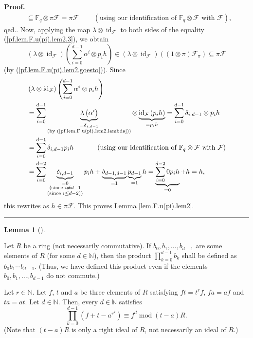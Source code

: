 \documentclass[numbers=enddot,12pt,final,onecolumn,notitlepage]{scrartcl}%
\theoremstyle{definition}
\newtheorem{lem}[theo]{Lemma}
\newenvironment{lemma}[1][]
{\begin{lem}[#1]\begin{leftbar}}
{\end{leftbar}\end{lem}}
\newenvironment{proof}[1][Proof]{\noindent\textbf{#1.} }{\ \rule{0.5em}{0.5em}}
\let\sumnonlimits\sum
\let\prodnonlimits\prod
\renewcommand{\sum}{\sumnonlimits\limits}
\renewcommand{\prod}{\prodnonlimits\limits}
\begin{document}
\begin{proof}
{\begin{align*}
&  \subseteq\mathbb{F}_{q}\otimes\pi\mathcal{F}=\pi\mathcal{F}%
\ \ \ \ \ \ \ \ \ \ \left(  \text{using our identification of }\mathbb{F}%
_{q}\otimes\mathcal{F}\text{ with }\mathcal{F}\right)  ,
\end{align*}
qed.}. Now, applying the map $\lambda\otimes\operatorname*{id}%
\nolimits_{\mathcal{F}}$ to both sides of the equality
(\ref{pf.lem.F.u(pi).lem2.3}), we obtain%
\[
\left(  \lambda\otimes\operatorname*{id}\nolimits_{\mathcal{F}}\right)
\left(  \sum_{i=0}^{d-1}\alpha^{i}\otimes p_{i}h\right)  \in\left(
\lambda\otimes\operatorname*{id}\nolimits_{\mathcal{F}}\right)  \left(
\left(  1\otimes\pi\right)  \mathcal{F}_{\pi}\right)  \subseteq\pi\mathcal{F}%
\]
(by (\ref{pf.lem.F.u(pi).lem2.goesto})). Since%
\begin{align*}
&  \left(  \lambda\otimes\operatorname*{id}\nolimits_{\mathcal{F}}\right)
\left(  \sum_{i=0}^{d-1}\alpha^{i}\otimes p_{i}h\right) \\
&  =\sum_{i=0}^{d-1}\underbrace{\lambda\left(  \alpha^{i}\right)
}_{\substack{=\delta_{i,d-1}\\\text{(by (\ref{pf.lem.F.u(pi).lem2.lambda}))}%
}}\otimes\underbrace{\operatorname*{id}\nolimits_{\mathcal{F}}\left(
p_{i}h\right)  }_{=p_{i}h}=\sum_{i=0}^{d-1}\delta_{i,d-1}\otimes p_{i}h\\
&  =\sum_{i=0}^{d-1}\delta_{i,d-1}p_{i}h\ \ \ \ \ \ \ \ \ \ \left(
\text{using our identification of }\mathbb{F}_{q}\otimes\mathcal{F}\text{ with
}\mathcal{F}\right) \\
&  =\sum_{i=0}^{d-2}\underbrace{\delta_{i,d-1}}_{\substack{=0\\\text{(since
}i\neq d-1\\\text{(since }i\leq d-2\text{))}}}p_{i}h+\underbrace{\delta
_{d-1,d-1}}_{=1}\underbrace{p_{d-1}}_{=1}h=\underbrace{\sum_{i=0}^{d-2}%
0p_{i}h}_{=0}+h=h,
\end{align*}
this rewrites as $h\in\pi\mathcal{F}$. This proves Lemma
\ref{lem.F.u(pi).lem2}.
\end{proof}

\begin{lemma}
\label{lem.F.u(pi).prod-deform}Let $R$ be a ring (not necessarily
commutative). If $b_{0},b_{1},\ldots,b_{d-1}$ are some elements of $R$ (for
some $d\in\mathbb{N}$), then the product $\prod_{k=0}^{d-1}b_{k}$ shall be
defined as $b_{0}b_{1}\cdots b_{d-1}$. (Thus, we have defined this product
even if the elements $b_{0},b_{1},\ldots,b_{d-1}$ do not commute.)

Let $r\in\mathbb{N}$. Let $f$, $t$ and $a$ be three elements of $R$ satisfying
$ft=t^{r}f$, $fa=af$ and $ta=at$. Let $d\in\mathbb{N}$. Then, every
$d\in\mathbb{N}$ satisfies%
\begin{equation}
\prod_{k=0}^{d-1}\left(  f+t-a^{r^{k}}\right)  \equiv f^{d}\operatorname{mod}%
\left(  t-a\right)  R. \label{eq.lem.F.u(pi).prod-deform.1}%
\end{equation}
(Note that $\left(  t-a\right)  R$ is only a right ideal of $R$, not
necessarily an ideal of $R$.)
\end{lemma}
\end{document}
